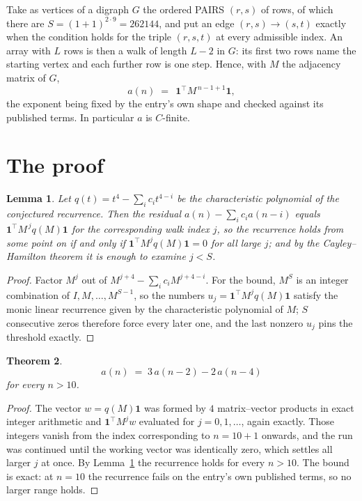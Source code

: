 \documentclass[11pt,a4paper]{article}
\theoremstyle{plain}
\newtheorem{theorem}{Theorem}
\newtheorem{lemma}[theorem]{Lemma}
\theoremstyle{definition}
\begin{document}
Take as vertices of a digraph $G$ the ordered PAIRS $(r,s)$ of rows, of which there are
$S=(1+1)^{2\cdot9}=262144$, and put an edge $(r,s)\to(s,t)$ exactly when the condition
holds for the triple $(r,s,t)$ at every admissible index. An array with $L$ rows is then a
walk of length $L-2$ in $G$: its first two rows name the starting vertex and each further
row is one step. Hence, with $M$ the adjacency matrix of $G$,
\[
a(n)\;=\;\,\mathbf{1}^{\!\top}M^{\,n-1+1}\mathbf{1},
\]
the exponent being fixed by the entry's own shape and checked against its published terms.
In particular $a$ is $C$-finite.

\section{The proof}

\begin{lemma}\label{lem:crit}
Let $q(t)=t^{4}-\sum_i c_it^{4-i}$ be the characteristic polynomial of the
conjectured recurrence. Then the residual $a(n)-\sum_ic_ia(n-i)$ equals
$\mathbf{1}^{\!\top}M^{\,j}q(M)\mathbf{1}$ for the corresponding walk index
$j$, so the recurrence holds from some point on if and only if
$\mathbf{1}^{\!\top}M^{j}q(M)\mathbf{1}=0$ for all large $j$; and by the
Cayley--Hamilton theorem it is enough to examine $j<S$.
\end{lemma}

\begin{proof}
Factor $M^{j}$ out of $M^{j+4}-\sum_ic_iM^{j+4-i}$. For the bound, $M^{S}$
is an integer combination of $I,M,\dots,M^{S-1}$, so the numbers
$u_j=\mathbf{1}^{\!\top}M^{j}q(M)\mathbf{1}$ satisfy the monic linear recurrence given by
the characteristic polynomial of $M$; $S$ consecutive zeros therefore force every later one,
and the last nonzero $u_j$ pins the threshold exactly.
\end{proof}

\begin{theorem}
\[
a(n)\;=\;3\,a(n-2) - 2\,a(n-4)
\]
for every $n>10$.
\end{theorem}

\begin{proof}
The vector $w=q(M)\mathbf{1}$ was formed by $4$ matrix--vector products in exact
integer arithmetic and $\mathbf{1}^{\!\top}M^{j}w$ evaluated for $j=0,1,\dots$, again
exactly. Those integers vanish from the index corresponding to $n=10+1$ onwards, and the
run was continued until the working vector was identically zero, which settles all larger $j$
at once. By Lemma~\ref{lem:crit} the recurrence holds for every $n>10$. The bound is exact: at $n=10$ the recurrence fails on the entry's own published terms, so no larger range holds.
\end{proof}
\end{document}
